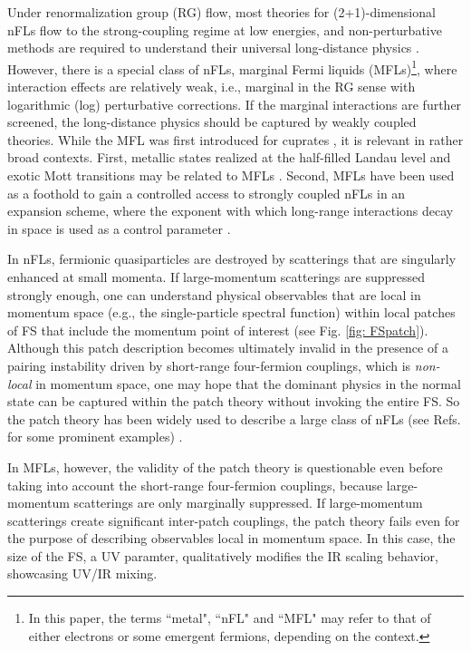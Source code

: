 \documentclass[prl,amsmath,amssymb, notitlepage, twocolumn,
nofootinbib,
superscriptaddress,
longbibliography
]{revtex4-1}
\newcommand{\ie}{{i.e., }}
\newcommand{\eg}{{e.g., }}
\begin{document}
Under renormalization group (RG) flow, most theories for (2+1)-dimensional nFLs flow to the strong-coupling regime at low energies,
and non-perturbative methods are required to understand their universal long-distance physics \cite{Sur2013,PhysRevX.7.021010}.
However, there is a special class of nFLs,
marginal Fermi liquids (MFLs)\footnote{In this paper, the terms ``metal", ``nFL" and ``MFL" may refer to that of either electrons or some emergent fermions, depending on the context.},
where interaction effects are relatively weak,
\ie marginal in the RG sense with logarithmic (log) perturbative corrections.
If the marginal interactions are further screened, the long-distance physics should be captured by weakly coupled theories.
While the MFL was first introduced for cuprates \cite{
VARMALI},
it is relevant in rather broad contexts.
First, metallic states realized at the half-filled Landau level and exotic Mott transitions may be related to MFLs \cite{HLR,Senthil2008}. 
Second,  MFLs have been used as a foothold to gain a controlled access to strongly coupled nFLs in an expansion scheme,
where the exponent with which long-range interactions decay in space is used as a control parameter \cite{Nayak1994,Mross2010}.

In nFLs, fermionic quasiparticles are destroyed by scatterings that are singularly enhanced at small momenta. If large-momentum scatterings are suppressed strongly enough, 
one can understand physical observables that are local in momentum space (\eg the single-particle spectral function) within local patches of FS that include the momentum point of interest (see Fig. \ref{fig: FSpatch}). 
Although this patch description becomes ultimately invalid in the presence of a pairing instability driven by short-range four-fermion couplings,
which is {\it non-local} in momentum space, 
one may hope that the dominant physics in the normal state can be captured within the patch theory without invoking the entire FS. 
So the patch theory \cite{Lee2008, Lee2009, Metlitski2010, Mross2010, Metlitski2014} has been widely used to describe a large class of nFLs (see Refs. \cite{HLR,Senthil2008,Lee1992,Lee2005} for some prominent examples) . 

In MFLs, however, the validity of the patch theory is questionable even before taking into account the short-range four-fermion couplings, because large-momentum scatterings are only marginally suppressed.
If large-momentum scatterings create significant inter-patch couplings, the patch theory fails even for the purpose of describing observables local in momentum space.
In this case, the size of the FS, a UV paramter, qualitatively modifies the IR scaling behavior, showcasing UV/IR mixing.
\end{document}

